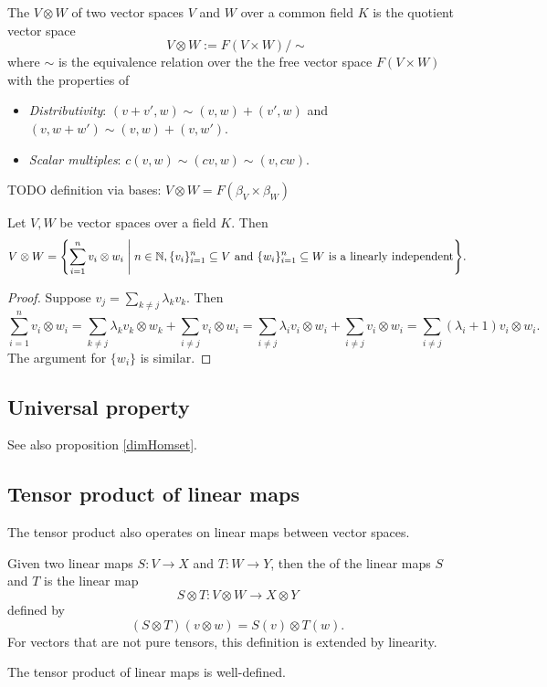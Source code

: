 The  $V\otimes W$ of two vector spaces $V$ and $W$ over a common field $K$ is the quotient vector space
\[ V\otimes W := F(V\times W)/\sim \]
where $\sim$ is the equivalence relation over the the free vector space $F(V\times W)$ with the properties of
\begin{itemize}
\item \textit{Distributivity}: $(v+v', w) \sim (v,w) + (v',w)$ and $(v, w+w') \sim (v,w) + (v,w')$.
\item \textit{Scalar multiples}: $c(v,w) \sim (cv,w) \sim (v,cw)$.
\end{itemize}



TODO definition via bases: $V\otimes W = F(\beta_V\times \beta_W)$

\begin{lemma} \label{tensorProductLinearlyIndependentBasis}
Let $V,W$ be vector spaces over a field $K$. Then
\[ V\otimes W = \setbuilder{\sum_{i=1}^n v_i\otimes w_i}{n\in \N, \text{$\{v_i\}_{i=1}^n\subseteq V$ and $\{w_i\}_{i=1}^n\subseteq W$ is a linearly independent}}. \]
\end{lemma}
\begin{proof}
Suppose $v_{j} = \sum_{k\neq j}\lambda_kv_k$. Then 
\[ \sum_{i=1}^n v_i\otimes w_i = \sum_{k\neq j}\lambda_kv_k\otimes w_k + \sum_{i\neq j} v_i\otimes w_i = \sum_{i\neq j}\lambda_iv_i\otimes w_i + \sum_{i\neq j} v_i\otimes w_i = \sum_{i\neq j} (\lambda_i+1)v_i\otimes w_i. \]
The argument for $\{w_i\}$ is similar.
\end{proof}

\subsection{Universal property}
See also proposition \ref{dimHomset}.


\subsection{Tensor product of linear maps}
The tensor product also operates on linear maps between vector spaces.
\begin{definition}
Given two linear maps $S: V\to X$ and $T:W\to Y$, then the  of the linear maps $S$ and $T$ is the linear map
\[ S\otimes T: V\otimes W \to X\otimes Y \]
defined by
\[ (S\otimes T)(v\otimes w) = S(v)\otimes T(w). \]
For vectors that are not pure tensors, this definition is extended by linearity.
\end{definition}
\begin{lemma}
The tensor product of linear maps is well-defined.
\end{lemma}

